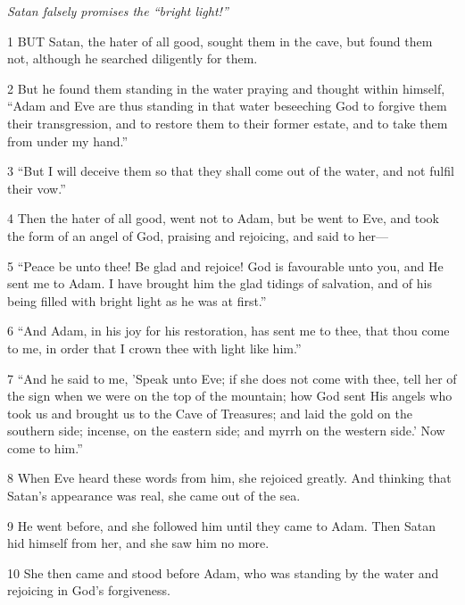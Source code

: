 \par \textit{Satan falsely promises the “bright light!”}

\par 1 BUT Satan, the hater of all good, sought them in the cave, but found them not, although he searched diligently for them.

\par 2 But he found them standing in the water praying and thought within himself, “Adam and Eve are thus standing in that water beseeching God to forgive them their transgression, and to restore them to their former estate, and to take them from under my hand.”

\par 3 “But I will deceive them so that they shall come out of the water, and not fulfil their vow.”

\par 4 Then the hater of all good, went not to Adam, but be went to Eve, and took the form of an angel of God, praising and rejoicing, and said to her—

\par 5 “Peace be unto thee! Be glad and rejoice! God is favourable unto you, and He sent me to Adam. I have brought him the glad tidings of salvation, and of his being filled with bright light as he was at first.”

\par 6 “And Adam, in his joy for his restoration, has sent me to thee, that thou come to me, in order that I crown thee with light like him.”

\par 7 “And he said to me, 'Speak unto Eve; if she does not come with thee, tell her of the sign when we were on the top of the mountain; how God sent His angels who took us and brought us to the Cave of Treasures; and laid the gold on the southern side; incense, on the eastern side; and myrrh on the western side.' Now come to him.”

\par 8 When Eve heard these words from him, she rejoiced greatly. And thinking that Satan's appearance was real, she came out of the sea.

\par 9 He went before, and she followed him until they came to Adam. Then Satan hid himself from her, and she saw him no more.

\par 10 She then came and stood before Adam, who was standing by the water and rejoicing in God's forgiveness.


